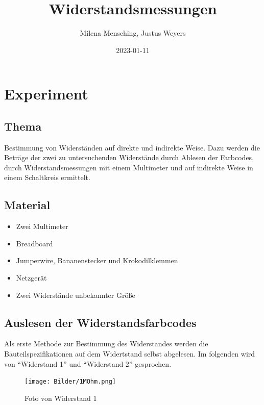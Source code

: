 \documentclass[
  9pt,
]{article}
\title{Widerstandsmessungen}
\author{Milena Mensching, Justus Weyers}
\date{2023-01-11}
\begin{document}
\maketitle

\hypertarget{experiment}{%
\section{Experiment}\label{experiment}}

\hypertarget{thema}{%
\subsection{Thema}\label{thema}}

Bestimmung von Widerständen auf direkte und indirekte Weise. Dazu werden
die Beträge der zwei zu untersuchenden Widerstände durch Ablesen der
Farbcodes, durch Widerstandsmessungen mit einem Multimeter und auf
indirekte Weise in einem Schaltkreis ermittelt.

\hypertarget{material}{%
\subsection{Material}\label{material}}

\begin{itemize}
\item{Zwei Multimeter}
\item{Breadboard}
\item{Jumperwire, Bananenstecker und Krokodilklemmen}
\item{Netzgerät}
\item{Zwei Widerstände unbekannter Größe}
\end{itemize}

\hypertarget{auslesen-der-widerstandsfarbcodes}{%
\subsection{Auslesen der
Widerstandsfarbcodes}\label{auslesen-der-widerstandsfarbcodes}}

Als erste Methode zur Bestimmung des Widerstandes werden die
Bauteilspezifikationen auf dem Widertstand selbst abgelesen. Im
folgenden wird von ``Widerstand 1'' und ``Widerstand 2'' gesprochen.

\begin{figure}
\centering
\texttt{[image: Bilder/1MOhm.png]}
\caption{Foto von Widerstand 1}
\end{figure}
\end{document}
